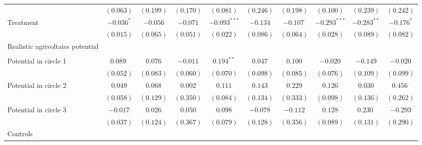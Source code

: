 \begin{center}
\begin{small}
\begin{longtable}{l@{} c@{} c@{} c@{} c@{} c@{} c@{} c@{} c@{} c@{}}
                                    & $(0.063)$       & $(0.199)$        & $(0.170)$   & $(0.081)$      & $(0.246)$    & $(0.198)$        & $(0.100)$       & $(0.239)$       & $(0.242)$       \\
Treatment                           & $-0.036^{*}$    & $-0.056$         & $-0.071$    & $-0.093^{***}$ & $-0.134$     & $-0.107^{\cdot}$ & $-0.293^{***}$  & $-0.283^{**}$   & $-0.176^{*}$    \\
                                    & $(0.015)$       & $(0.065)$        & $(0.051)$   & $(0.022)$      & $(0.086)$    & $(0.064)$        & $(0.028)$       & $(0.089)$       & $(0.082)$       \\
Realistic agrivoltaics potential    &                 &                  &             &                &              &                  &                 &                 &                 \\
                                    &                 &                  &             &                &              &                  &                 &                 &                 \\
\quad Potential in circle 1         & $0.089^{\cdot}$ & $0.076$          & $-0.011$    & $0.194^{**}$   & $0.047$      & $0.100$          & $-0.020$        & $-0.149$        & $-0.020$        \\
                                    & $(0.052)$       & $(0.083)$        & $(0.060)$   & $(0.070)$      & $(0.098)$    & $(0.085)$        & $(0.076)$       & $(0.109)$       & $(0.099)$       \\
\quad Potential in circle 2         & $0.049$         & $0.068$          & $0.002$     & $0.111$        & $0.143$      & $0.229$          & $0.126$         & $0.030$         & $0.456^{\cdot}$ \\
                                    & $(0.058)$       & $(0.129)$        & $(0.350)$   & $(0.084)$      & $(0.134)$    & $(0.333)$        & $(0.098)$       & $(0.136)$       & $(0.262)$       \\
\quad Potential in circle 3         & $-0.017$        & $0.026$          & $0.050$     & $0.098$        & $-0.078$     & $-0.112$         & $0.128$         & $0.230^{\cdot}$ & $-0.293$        \\
                                    & $(0.037)$       & $(0.124)$        & $(0.367)$   & $(0.079)$      & $(0.128)$    & $(0.356)$        & $(0.089)$       & $(0.131)$       & $(0.290)$       \\
Controls                            &                 &                  &             &                &              &                  &                 &                 &                 \\

\end{longtable}
\end{small}
\end{center}
